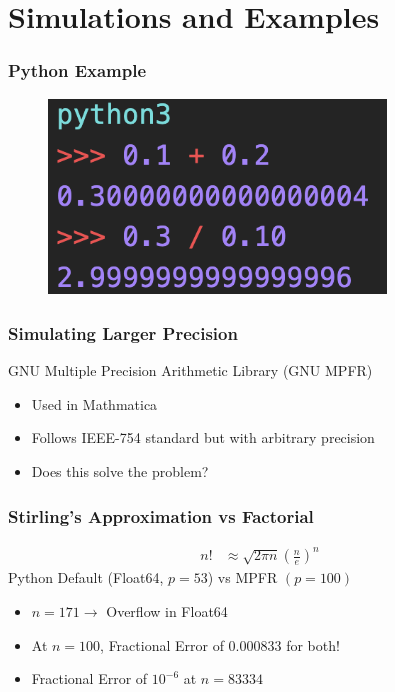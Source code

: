 \documentclass[10pt]{beamer}
\begin{document}
\section{Simulations and Examples}
\begin{frame}
    \frametitle{Python Example}
    \begin{figure}
        \centering
        \includegraphics[width=0.8\textwidth]{pythoneg.png}
    \end{figure}
\end{frame}
\begin{frame}
    \frametitle{Simulating Larger Precision}
    GNU Multiple Precision Arithmetic Library (GNU MPFR)
    \begin{itemize}
        \item Used in Mathmatica
        \item Follows IEEE-754 standard but with arbitrary precision
        \item Does this solve the problem?
    \end{itemize}
\end{frame}
\begin{frame}
    \frametitle{Stirling's Approximation vs Factorial}
    \begin{align*}
        n! &\approx \sqrt{2\pi n} \left(\frac{n}{e}\right)^n
    \end{align*}
    \pause
    Python Default (Float64, $p=53$) vs MPFR $(p = 100)$
    \begin{itemize}
        \item $n = 171 \to $ Overflow in Float64
        \item At $n = 100$, Fractional Error of $0.000833$ for both!
        \item Fractional Error of $10^{-6}$ at $n = 83334$ 
    \end{itemize}
\end{frame}
\end{document}

